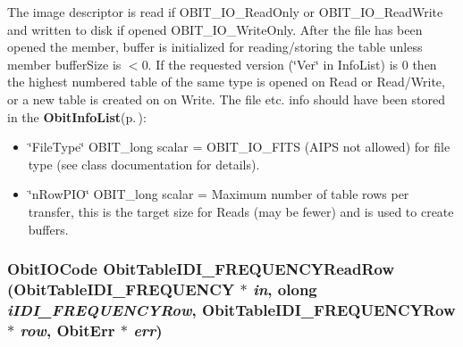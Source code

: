 The image descriptor is read if OBIT\_\-IO\_\-Read\-Only or OBIT\_\-IO\_\-Read\-Write and written to disk if opened OBIT\_\-IO\_\-Write\-Only. After the file has been opened the member, buffer is initialized for reading/storing the table unless member buffer\-Size is $<$0. If the requested version (\char`\"{}Ver\char`\"{} in Info\-List) is 0 then the highest numbered table of the same type is opened on Read or Read/Write, or a new table is created on on Write. The file etc. info should have been stored in the {\bf Obit\-Info\-List}{\rm (p.\,\pageref{structObitInfoList})}: \begin{itemize}
\item \char`\"{}File\-Type\char`\"{} OBIT\_\-long scalar = OBIT\_\-IO\_\-FITS (AIPS not allowed) for file type (see class documentation for details). \item \char`\"{}n\-Row\-PIO\char`\"{} OBIT\_\-long scalar = Maximum number of table rows per transfer, this is the target size for Reads (may be fewer) and is used to create buffers. 
\end{itemize}
\subsubsection{\setlength{\rightskip}{0pt plus 5cm}Obit\-IOCode Obit\-Table\-IDI\_\-FREQUENCYRead\-Row ({\bf Obit\-Table\-IDI\_\-FREQUENCY} $\ast$ {\em in}, {\bf olong} {\em i\-IDI\_\-FREQUENCYRow}, {\bf Obit\-Table\-IDI\_\-FREQUENCYRow} $\ast$ {\em row}, {\bf Obit\-Err} $\ast$ {\em err})}\label{ObitTableIDI__FREQUENCY_8c_a22}


